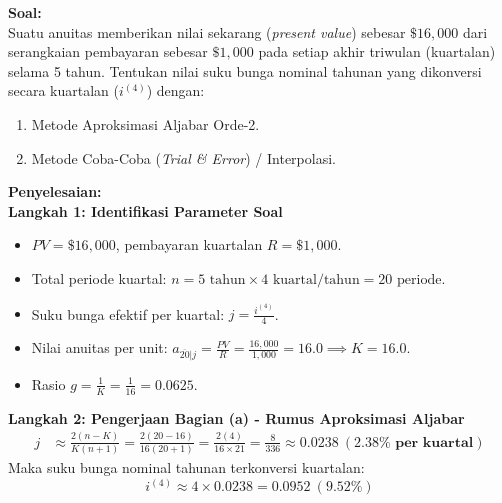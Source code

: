 \documentclass[11pt,a4paper]{article}
\begin{document}
\begin{examplebox}
\textbf{Soal:}\\
Suatu anuitas memberikan nilai sekarang (\textit{present value}) sebesar $\$16{,}000$ dari serangkaian pembayaran sebesar $\$1{,}000$ pada setiap akhir triwulan (kuartalan) selama 5 tahun. 
Tentukan nilai suku bunga nominal tahunan yang dikonversi secara kuartalan ($i^{(4)}$) dengan:
\begin{enumerate}[label=(\alph*)]
    \item Metode Aproksimasi Aljabar Orde-2.
    \item Metode Coba-Coba (\textit{Trial \& Error}) / Interpolasi.
\end{enumerate}

\vspace{0.5em}
\textbf{Penyelesaian:}\\
\textbf{Langkah 1: Identifikasi Parameter Soal}
\begin{itemize}
    \item $PV = \$16{,}000$, pembayaran kuartalan $R = \$1{,}000$.
    \item Total periode kuartal: $n = 5 \text{ tahun} \times 4 \text{ kuartal/tahun} = 20 \text{ periode}$.
    \item Suku bunga efektif per kuartal: $j = \frac{i^{(4)}}{4}$.
    \item Nilai anuitas per unit: $a_{\overline{20}|j} = \frac{PV}{R} = \frac{16{,}000}{1{,}000} = 16.0 \implies K = 16.0$.
    \item Rasio $g = \frac{1}{K} = \frac{1}{16} = 0.0625$.
\end{itemize}

\textbf{Langkah 2: Pengerjaan Bagian (a) - Rumus Aproksimasi Aljabar}
\begin{align*}
    j &\approx \frac{2(n - K)}{K(n + 1)} = \frac{2(20 - 16)}{16(20 + 1)} = \frac{2(4)}{16 \times 21} = \frac{8}{336} \approx \mathbf{0.0238 \ (2.38\% \text{ per kuartal})}
\end{align*}
Maka suku bunga nominal tahunan terkonversi kuartalan:
\begin{equation*}
    i^{(4)} \approx 4 \times 0.0238 = \mathbf{0.0952 \ (9.52\%)}
\end{equation*}


\end{examplebox}
\end{document}
